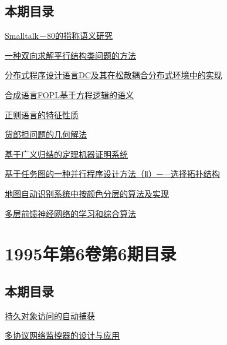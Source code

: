 \documentclass[a4paper]{article}
\begin{document}
\subsection{本期目录}
\href{http://www.jos.org.cn/ch/reader/download_pdf.aspx?file_no=19950701&year_id=1995&quarter_id=7&falg=1}{Smalltalk－80的指称语义研究}

\href{http://www.jos.org.cn/ch/reader/download_pdf.aspx?file_no=19950702&year_id=1995&quarter_id=7&falg=1}{一种双向求解平行结构类问题的方法}

\href{http://www.jos.org.cn/ch/reader/download_pdf.aspx?file_no=19950703&year_id=1995&quarter_id=7&falg=1}{分布式程序设计语言DC及其在松散耦合分布式环境中的实现}

\href{http://www.jos.org.cn/ch/reader/download_pdf.aspx?file_no=19950704&year_id=1995&quarter_id=7&falg=1}{合成语言FOPL基于方程逻辑的语义}

\href{http://www.jos.org.cn/ch/reader/download_pdf.aspx?file_no=19950705&year_id=1995&quarter_id=7&falg=1}{正则语言的特征性质}

\href{http://www.jos.org.cn/ch/reader/download_pdf.aspx?file_no=19950706&year_id=1995&quarter_id=7&falg=1}{货郎担问题的几何解法}

\href{http://www.jos.org.cn/ch/reader/download_pdf.aspx?file_no=19950707&year_id=1995&quarter_id=7&falg=1}{基于广义归结的定理机器证明系统}

\href{http://www.jos.org.cn/ch/reader/download_pdf.aspx?file_no=19950708&year_id=1995&quarter_id=7&falg=1}{基于任务图的一种并行程序设计方法（Ⅱ）─—选择拓扑结构}

\href{http://www.jos.org.cn/ch/reader/download_pdf.aspx?file_no=19950709&year_id=1995&quarter_id=7&falg=1}{地图自动识别系统中按颜色分层的算法及实现}

\href{http://www.jos.org.cn/ch/reader/download_pdf.aspx?file_no=19950710&year_id=1995&quarter_id=7&falg=1}{多层前馈神经网络的学习和综合算法}


\section{\textbf{1995年第6卷第6期目录}}
\subsection{本期目录}
\href{http://www.jos.org.cn/ch/reader/download_pdf.aspx?file_no=19950601&year_id=1995&quarter_id=6&falg=1}{持久对象访问的自动捕获}

\href{http://www.jos.org.cn/ch/reader/download_pdf.aspx?file_no=19950602&year_id=1995&quarter_id=6&falg=1}{多协议网络监控器的设计与应用}
\end{document}
